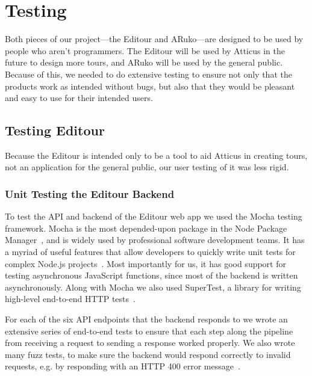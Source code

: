 \documentclass[a4paper, 10pt, american, titlepage]{article}
\begin{document}
\newpage

\section{Testing}
\label{sec:testing}

Both pieces of our project---the Editour and ARuko---are designed to be used by
people who aren't programmers. The Editour will be used by Atticus in the future
to design more tours, and ARuko will be used by the general public. Because of
this, we needed to do extensive testing to ensure not only that the products
work as intended without bugs, but also that they would be pleasant and easy to
use for their intended users.

\subsection{Testing Editour}
\label{sec:testingEditour}

Because the Editour is intended only to be a tool to aid Atticus in creating
tours, not an application for the general public, our user testing of it was less
rigid.

\subsubsection{Unit Testing the Editour Backend}
\label{sec:unitTestingTheEditourBackend}

To test the API and backend of the Editour web app we used the Mocha testing
framework. Mocha is the most depended-upon package in the Node Package
Manager~\autocite{tidelift2019}, and is widely used by professional software
development teams. It has a myriad of useful features that allow developers to
quickly write unit tests for complex Node.js projects~\autocite{mochajs2019}.
Most importantly for us, it has good support for testing asynchronous JavaScript
functions, since most of the backend is written asynchronously. Along with Mocha
we also used SuperTest, a library for writing high-level end-to-end HTTP
tests~\autocite{supertest2019}.

For each of the six API endpoints that the backend responds to we wrote an
extensive series of end-to-end tests to ensure that each step along the pipeline
from receiving a request to sending a response worked properly. We also wrote
many fuzz tests, to make sure the backend would respond correctly to invalid
requests, e.g. by responding with an HTTP 400 error message~\autocite{rfc7231}.
\end{document}
